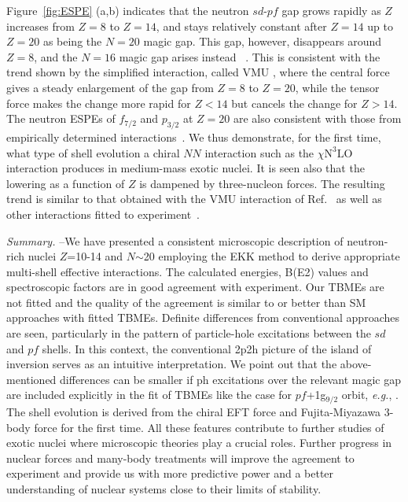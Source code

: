 \documentclass[aps,prl,twocolumn,groupedaddress,showkeys,showpacs,floatfix,superscriptaddress]{revtex4-1}
\newcommand\+{^\dagger}
\newcommand\ntlo{\chi\mathrm{N}^3\mathrm{LO} }
\begin{document}
Figure~\ref{fig:ESPE} (a,b) indicates that the neutron $sd$-$pf$ gap grows 
rapidly as $Z$ increases
from $Z=8$ to $Z=14$, and stays relatively constant after $Z=14$ up to $Z=20$ 
as being the $N=20$ magic gap.
This gap, however, disappears around $Z=8$, and the $N=16$ magic gap arises instead
~\cite{brownN16,ozawaPRL84,magic}.  
This is consistent with the trend shown by the simplified interaction, called VMU \cite{Otsuka:2009qs}, 
where the central force gives a steady enlargement of the gap from $Z=8$ to $Z=20$, 
while the tensor force makes the change more rapid for $Z < 14$ but cancels the change for  
$Z >14$.  
The neutron ESPEs of $f_{7/2}$ and $p_{3/2}$ at $Z=20$ are also consistent
with those from empirically determined interactions~\cite{PhysRevC.60.054315}.
We thus demonstrate, for the first time, what type of shell evolution a chiral $NN$ interaction 
such as the $\ntlo$ interaction produces in medium-mass exotic nuclei.   
It is seen also that the lowering as a function of $Z$ is dampened  by three-nucleon forces.
The resulting trend is similar to that obtained  with the VMU
interaction of Ref.~\cite{Otsuka:2009qs} as well as other interactions
fitted to experiment~\cite{PhysRevC.60.054315,Caurier:2013aoa,RevModPhys.77.427}.


{\it Summary.} --We have presented a consistent microscopic description of neutron-rich nuclei
$Z$=10-14 and $N$$\sim$20 employing  the EKK method to derive appropriate multi-shell effective interactions.
The calculated energies, B(E2) values and spectroscopic factors are 
in good agreement with experiment.  Our TBMEs are not fitted and
the quality of the agreement is similar to or better than SM approaches with fitted TBMEs.
Definite differences from conventional approaches are seen, particularly in the 
pattern of particle-hole excitations between the $sd$ and $pf$ shells.  
In this context, the conventional 2p2h picture of the island of inversion 
serves as an intuitive interpretation.
We point out that the above-mentioned differences can be smaller  
if ph excitations over the relevant magic gap are included explicitly in the fit of TBMEs 
like the case for $pf$+1g$_{9/2}$ orbit, {\it e.g.}, \cite{jun45,68ni}. 
The shell evolution is derived from the chiral EFT force and 
Fujita-Miyazawa 3-body force for the first time.
All these features contribute to further studies of exotic nuclei where microscopic theories 
play a crucial roles.  
Further progress in nuclear forces and many-body treatments will improve
the agreement to experiment and provide us with more predictive power and a better understanding of
nuclear systems close to their limits of stability.
\end{document}
